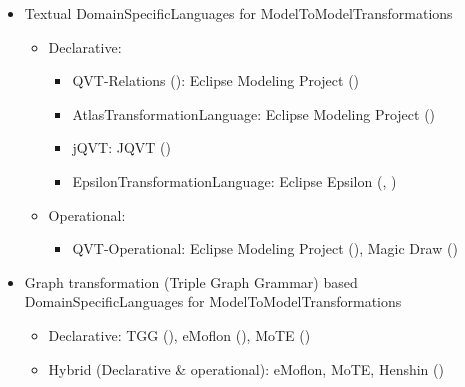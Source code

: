 \begin{itemize}
\item Textual \glspl{DomainSpecificLanguage} for \glspl{ModelToModelTransformation}
	\begin{itemize}
	\item Declarative:
			\begin{itemize}
			\item QVT-Relations (\cite{ObjectManagementGroup2011}): Eclipse Modeling Project (\cite{EclipseFoundation2014a})
			\item \gls{AtlasTransformationLanguage}: Eclipse Modeling Project (\cite{EclipseFoundation2013})
			\item jQVT: JQVT (\cite{Song2012})
			\item \gls{EpsilonTransformationLanguage}: Eclipse Epsilon (\cite{Kolovos2013}, \cite{EclipseFoundation2012})
			\end{itemize}
	\item Operational: 
		\begin{itemize}		
		\item QVT-Operational: Eclipse Modeling Project (\cite{EclipseFoundation2014a}), Magic Draw (\cite{NoMagicInc})
		\end{itemize}
	\end{itemize}
	
\item Graph transformation (Triple Graph Grammar) based \glspl{DomainSpecificLanguage} for \glspl{ModelToModelTransformation}
	\begin{itemize}
	\item Declarative: TGG (\cite{Greenyer2014}), eMoflon (\cite{Real-TimeSystemsLab2014}), MoTE (\cite{Hildebrandt})%
	\item Hybrid (Declarative \& operational): eMoflon, MoTE, Henshin (\cite{EclipseFoundation2013a})%
	\end{itemize}



\end{itemize}
